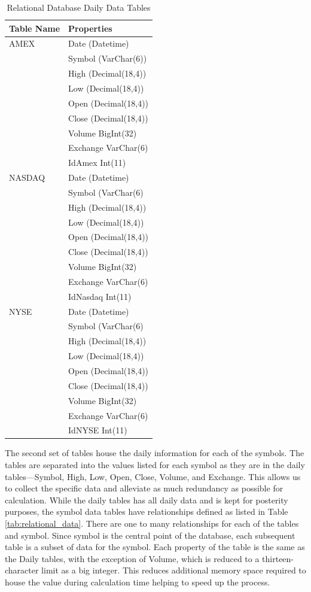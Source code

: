 \documentclass{IEEEtran}
\begin{document}
\begin{table}
	\centering
	\caption{Relational Database Daily Data Tables}
	\label{tab:daily_data}
\begin{tabular}{ll} \hline \hline
\textbf{Table Name} & \textbf{Properties} \\ \hline
AMEX & Date (Datetime) \\
 & Symbol (VarChar(6)) \\ 
 & High (Decimal(18,4)) \\
 & Low (Decimal(18,4)) \\
 & Open (Decimal(18,4)) \\
 & Close (Decimal(18,4)) \\
 & Volume BigInt(32) \\
 & Exchange VarChar(6) \\
 & IdAmex Int(11) \\ \hline
NASDAQ & Date (Datetime) \\
 & Symbol (VarChar(6) \\
 & High (Decimal(18,4)) \\
 & Low (Decimal(18,4)) \\
 & Open (Decimal(18,4)) \\
 & Close (Decimal(18,4)) \\
 & Volume BigInt(32) \\
 & Exchange VarChar(6) \\
 & IdNasdaq Int(11) \\ \hline
NYSE & Date (Datetime) \\
 & Symbol (VarChar(6) \\
 & High (Decimal(18,4)) \\
 & Low (Decimal(18,4)) \\
 & Open (Decimal(18,4)) \\
 & Close (Decimal(18,4)) \\
 & Volume BigInt(32) \\
 & Exchange VarChar(6) \\
 & IdNYSE Int(11) \\ \hline \hline
\end{tabular}
\end{table}

The second set of tables house the daily information for each of the symbols. The tables are separated into the values listed for each symbol as they are in the daily tables---Symbol, High, Low, Open, Close, Volume, and Exchange. This allows us to collect the specific data and alleviate as much redundancy as possible for calculation. While the daily tables has all daily data and is kept for posterity purposes, the symbol data tables have relationships defined as listed in Table \ref{tab:relational_data}. There are one to many relationships for each of the tables and symbol. Since symbol is the central point of the database, each subsequent table is a subset of data for the symbol. Each property of the table is the same as the Daily tables, with the exception of Volume, which is reduced to a thirteen-character limit as a big integer. This reduces additional memory space required to house the value during calculation time helping to speed up the process. 
\end{document}
